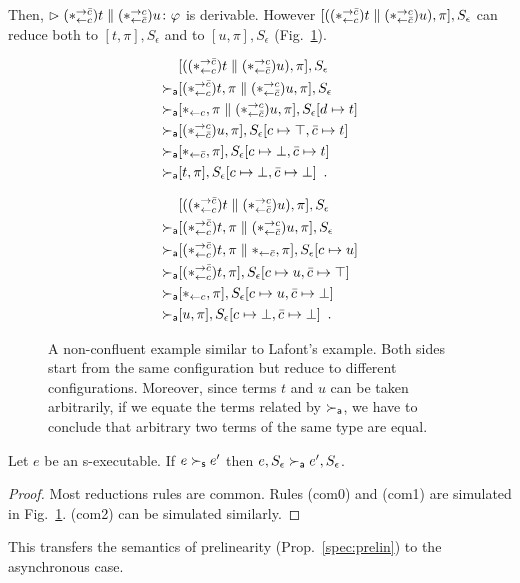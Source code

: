\documentclass[envcountsame]{llncs}
\begin{document}
Then,
$\vartriangleright{(\ast^{\rightarrow {\bar{c}}}_{\leftarrow{c}})t\parallel(\ast^{\rightarrow {c}}_{\leftarrow{\bar{c}}})u} \colon{\varphi}$ is derivable.
However $[((\ast^{\rightarrow {\bar{c}}}_{\leftarrow{c}})t\parallel (\ast^{\rightarrow {c}}_{\leftarrow{\bar{c}}})u),
\pi],S_\epsilon$
can reduce both to $[t,\pi], S_\epsilon$
and to $[u,\pi], S_\epsilon$ (Fig.~\ref{fig:lafont}).
\begin{figure}
 \begin{subfigure}[b]{0.45\textwidth}
  \begin{align*}
   & [((\ast^{\rightarrow {\bar{c}}}_{\leftarrow{c}})t\parallel (\ast^{\rightarrow {c}}_{\leftarrow{\bar{c}}}) u),\pi], S_\epsilon \\
   \succ_{\mathsf a} & [(\ast^{\rightarrow {\bar{c}}}_{\leftarrow{c}})t,\pi\parallel (\ast^{\rightarrow {c}}_{\leftarrow{\bar{c}}})u,\pi], S_\epsilon \\
   \succ_{\mathsf a} & [\ast_{\leftarrow{c}}, \pi\parallel (\ast^{\rightarrow {c}}_{\leftarrow{\bar{c}}})u,\pi], S_\epsilon[d\mapsto
   t] \\
   \succ_{\mathsf a} & [(\ast^{\rightarrow {c}}_{\leftarrow{\bar{c}}})u,\pi], S_\epsilon[c\mapsto \top, \bar{c}\mapsto t] \\
   \succ_{\mathsf a} & [\ast_{\leftarrow{\bar{c}}}, \pi], S_\epsilon[c\mapsto \bot, \bar{c}\mapsto t] \\
   \succ_{\mathsf a} & [t,\pi], S_\epsilon[c\mapsto \bot,\bar{c}\mapsto \bot]\enspace.
  \end{align*}
 \end{subfigure}
 \begin{subfigure}[b]{0.45\textwidth}
  \begin{align*}
   & [((\ast^{\rightarrow {\bar{c}}}_{\leftarrow{c}})t\parallel (\ast^{\rightarrow {c}}_{\leftarrow{\bar{c}}}) u),\pi], S_\epsilon \\
   \succ_{\mathsf a} & [(\ast^{\rightarrow {\bar{c}}}_{\leftarrow{c}})t,\pi\parallel (\ast^{\rightarrow {c}}_{\leftarrow{\bar{c}}})u,\pi], S_\epsilon \\
   \succ_{\mathsf a} & [(\ast^{\rightarrow {\bar{c}}}_{\leftarrow{c}})t,\pi\parallel \ast_{\leftarrow{\bar{c}}},\pi], S_\epsilon[c\mapsto u] \\
   \succ_{\mathsf a} & [(\ast^{\rightarrow {\bar{c}}}_{\leftarrow{c}})t,\pi], S_\epsilon[c\mapsto u, \bar{c}\mapsto \top] \\
   \succ_{\mathsf a} & [\ast_{\leftarrow{c}},\pi], S_\epsilon[c\mapsto u,\bar{c}\mapsto \bot] \\
   \succ_{\mathsf a} & [u,\pi], S_\epsilon[c\mapsto \bot,\bar{c}\mapsto \bot]\enspace.
  \end{align*}
 \end{subfigure}
 \caption[A non-confluent example similar to Lafont's example.]
 {A non-confluent example similar to Lafont's example.  Both sides start
 from the same configuration but reduce to different configurations.
 Moreover, since terms $t$ and $u$ can be taken arbitrarily, if we
 equate the terms related by $\succ_{\mathsf a}$, we have to conclude that arbitrary
 two terms of the same type are equal.}
 \label{fig:lafont}
\end{figure}

\begin{proposition}
 Let $e$ be an s-executable.
 If $e\succ_{\mathsf s} e'$ then $e, S_\epsilon \succ_{\mathsf a} e', S_\epsilon$.
\end{proposition}
\begin{proof}
 Most reductions rules are common.  Rules (com0) and (com1) are
 simulated in Fig.~\ref{fig:lafont}.  (com2) can be simulated similarly.
\end{proof}
This transfers the semantics of prelinearity (Prop.~\ref{spec:prelin}) to the asynchronous case.
\end{document}
